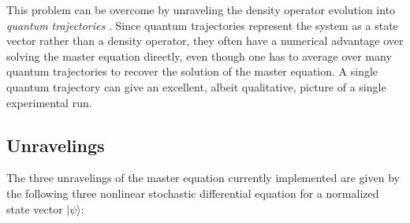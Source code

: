 This problem can be overcome by unraveling the density operator evolution into
{\it quantum trajectories\/} {\cite{Diosi1986,%
Gisin1992c,Carmichael1993b,Dalibard1992,Gardiner1992,Breslin1995}}.  Since
quantum trajectories represent the system as a state vector rather than a
density operator, they often have a numerical advantage over solving the master
equation directly, even though one has to average over many quantum
trajectories to recover the solution of the master equation. A single quantum
trajectory can give an excellent, albeit qualitative, picture of a single
experimental run.

\subsection{Unravelings}    

The three unravelings of the master equation currently implemented are given
by the following three nonlinear stochastic differential
equation for a normalized state vector $|\psi\rangle$: 

